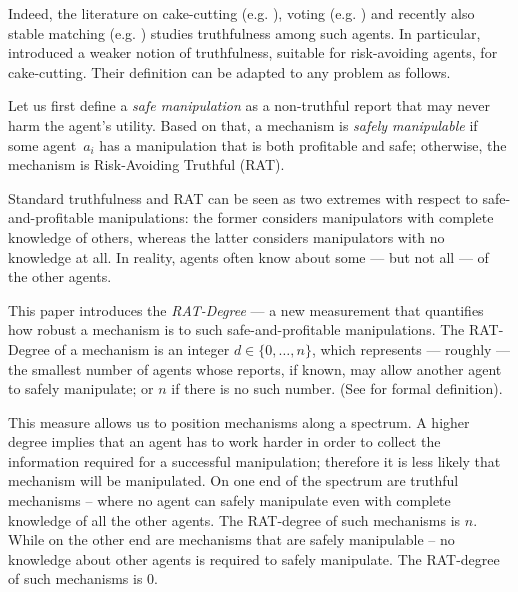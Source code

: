 Indeed, the literature on cake-cutting
(e.g. \cite{brams2006better,BU2023Rat}),
voting (e.g. \cite{slinko2008nondictatorial,slinko2014ever,hazon2010complexity})
 and recently also stable matching (e.g. \citet{regret2018Fernandez, chen2024regret})
studies truthfulness among such agents.
%
In particular, \citet{BU2023Rat} introduced a weaker notion of truthfulness, suitable for risk-avoiding agents, for cake-cutting. 
Their definition can be adapted to any problem as follows.


Let us first define a \emph{safe manipulation} as a non-truthful report that 
may never harm the agent's utility. 
Based on that, a mechanism is \emph{safely manipulable} if some agent~$a_i$ has a manipulation that is both profitable and safe; otherwise, the mechanism is Risk-Avoiding Truthful (RAT).

Standard truthfulness and RAT can be seen as two extremes with respect to safe-and-profitable manipulations: the former considers manipulators with complete knowledge of
others, whereas the latter considers manipulators with no knowledge at all. 
In reality, agents often know about some — but not all — of the other agents.

This paper introduces the \emph{RAT-Degree} — a new measurement that quantifies how robust a mechanism is to such safe-and-profitable manipulations.
The RAT-Degree of a mechanism is an integer $d \in \{0, \ldots, n\}$, which represents --- roughly --- 
the smallest number of agents whose reports, if known, may allow another agent to safely manipulate; or $n$ if there is no such number.   (See  for formal definition).


This measure allows us to position mechanisms along a spectrum. A higher degree implies that an agent has to work harder in order to collect the information required for a successful manipulation; therefore it is less likely that mechanism will be manipulated.
%
%
On one end of the spectrum are truthful mechanisms -- where no agent can safely manipulate even with complete knowledge of all the other agents. The RAT-degree of such mechanisms is $n$.
While on the other end are mechanisms that are safely manipulable -- no knowledge about other agents is required to safely manipulate. The RAT-degree of such mechanisms is $0$.

